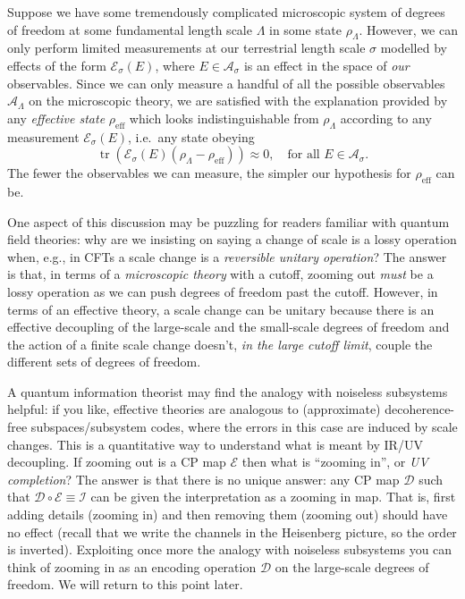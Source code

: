 \documentclass[11pt]{amsart}
\DeclareMathOperator{\tr}{tr}
\theoremstyle{plain}%
\theoremstyle{definition}
\theoremstyle{remark}
\begin{document}
Suppose we have some tremendously complicated microscopic system of degrees of freedom at some fundamental length scale $\Lambda$ in some state $\rho_\Lambda$. However, we can only perform limited measurements at our terrestrial length scale $\sigma$ modelled by effects of the form $\mathcal{E}_{\sigma}(E)$, where $E \in \mathcal{A}_{\sigma}$ is an effect in the space of \emph{our} observables. Since we can only measure a handful of all the possible observables $\mathcal{A}_\Lambda$ on the microscopic theory, we are satisfied with the explanation provided by any \emph{effective state} $\rho_{\text{eff}}$ which looks indistinguishable from $\rho_\Lambda$ according to any measurement $\mathcal{E}_{\sigma}(E)$, i.e.\ any state obeying
\begin{equation}
	\tr(\mathcal{E}_{\sigma}(E) (\rho_\Lambda - \rho_{\text{eff}})) \approx 0, \quad \text{for all } E\in \mathcal{A}_\sigma.
\end{equation}
The fewer the observables we can measure, the simpler our hypothesis for $\rho_{\text{eff}}$ can be. 

One aspect of this discussion may be puzzling for readers familiar with quantum field theories: why are we insisting on saying a change of scale is a lossy operation when, e.g., in CFTs a scale change is a \emph{reversible unitary operation}? The answer is that, in terms of a \emph{microscopic theory} with a cutoff, zooming out \emph{must} be a lossy operation as we can push degrees of freedom past the cutoff. However, in terms of an effective theory, a scale change can be unitary because there is an effective decoupling of the large-scale  and the small-scale degrees of freedom and the action of a finite scale change doesn't, \emph{in the large cutoff limit}, couple the different sets of degrees of freedom. 

A quantum information theorist may find the analogy with noiseless subsystems helpful: if you like, effective theories are analogous to (approximate) decoherence-free subspaces/subsystem codes, where the errors in this case are induced by scale changes. This is a quantitative way to understand what is meant by IR/UV decoupling. If zooming out is a CP map $\mathcal{E}$ then what is ``zooming in'', or \emph{UV completion}? The answer is that there is no unique answer: any CP map $\mathcal{D}$ such that $\mathcal{D}\circ \mathcal{E} \equiv \mathcal{I}$ can be given the interpretation as a zooming in map. That is, first adding details (zooming in) and then removing them (zooming out) should have no effect (recall that we write the channels in the Heisenberg picture, so the order is inverted). Exploiting once more the analogy with noiseless subsystems you can think of zooming in as an encoding operation $\mathcal{D}$ on the large-scale degrees of freedom. We will return to this point later.
\end{document}
